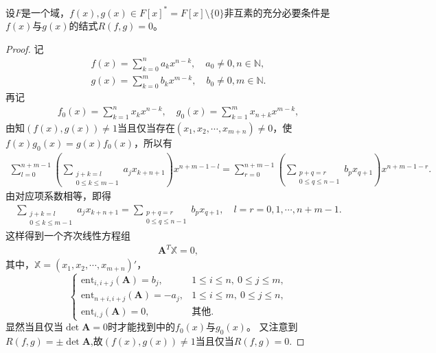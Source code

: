 \documentclass[../../main.tex]{subfiles}%
\begin{document}
\begin{theorem}\label{theorem:抽象代数--定理2.6.4}
设$F$是一个域，$f(x),g(x)\in F[x]^*=F[x]\setminus \{0\}$非互素的充分必要条件是$f(x)$与$g(x)$的结式$R(f,g)=0$。
\end{theorem}
\begin{proof}
记
\begin{align*}
f(x)=\sum_{k=0}^n a_kx^{n-k},\quad a_0\neq0,n\in\mathbb{N}, \\
g(x)=\sum_{k=0}^m b_kx^{m-k},\quad b_0\neq0,m\in\mathbb{N}.
\end{align*}
再记
\begin{align*}
f_0(x)=\sum_{k=1}^n x_kx^{n-k},\quad g_0(x)=\sum_{k=1}^m x_{n+k}x^{m-k},
\end{align*}
由知$(f(x),g(x))\neq1$当且仅当存在$(x_1,x_2,\cdots,x_{m+n})\neq0$，使$f(x)g_0(x)=g(x)f_0(x)$，所以有
\begin{align*}
\sum_{l=0}^{n+m-1}\left( \sum_{\substack{j+k=l\\0\leqslant k\leqslant m-1}} a_jx_{k+n+1} \right)x^{n+m-1-l} 
=\sum_{r=0}^{n+m-1}\left( \sum_{\substack{p+q=r\\0\leqslant q\leqslant n-1}} b_px_{q+1} \right)x^{n+m-1-r}.
\end{align*}
由对应项系数相等，即得
\begin{align*}
\sum_{\substack{j+k=l\\0\leqslant k\leqslant m-1}} a_jx_{k+n+1}=\sum_{\substack{p+q=r\\0\leqslant q\leqslant n-1}} b_px_{q+1},\quad l=r=0,1,\cdots,n+m-1.
\end{align*}
这样得到一个齐次线性方程组
\begin{align*}
\boldsymbol{A}^T\mathbb{X}=0,
\end{align*}
其中，$\mathbb{X}=(x_1,x_2,\cdots,x_{m+n})'$，
\[
\begin{cases}
\mathrm{ent}_{i,i+j}(\boldsymbol{A})=b_j, & 1\leqslant i\leqslant n,\ 0\leqslant j\leqslant m, \\
\mathrm{ent}_{n+i,i+j}(\boldsymbol{A})=-a_j, & 1\leqslant i\leqslant m,\ 0\leqslant j\leqslant n, \\
\mathrm{ent}_{i,j}(\boldsymbol{A})=0, & \text{其他}.
\end{cases}
\]
显然当且仅当$\det\boldsymbol{A}=0$时才能找到中的$f_0(x)$与$g_0(x)$。
又注意到$R(f,g)=\pm\det \boldsymbol{A}$,故$(f(x),g(x))\neq1$当且仅当$R(f,g)=0.$
\end{proof}
\end{document}
